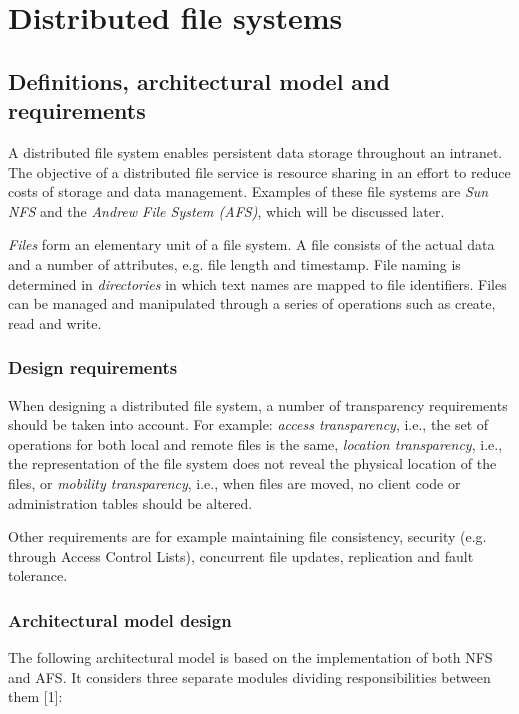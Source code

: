 \chapter{Distributed file systems}


\section{Definitions, architectural model and requirements}

A distributed file system enables persistent data storage throughout an intranet. The objective of a distributed file service is resource sharing in an effort to reduce costs of storage and data management. Examples of these file systems are \emph{Sun NFS} and the \emph{Andrew File System (AFS)}, which will be discussed later.

\emph{Files} form an elementary unit of a file system. A file consists of the actual data and a number of attributes, e.g. file length and timestamp. File naming is determined in \emph{directories} in which text names are mapped to file identifiers. Files can be managed and manipulated through a series of operations such as create, read and write.


\subsection{Design requirements}

When designing a distributed file system, a number of transparency requirements should be taken into account. For example: \emph{access transparency}, i.e., the set of operations for both local and remote files is the same, \emph{location transparency}, i.e., the representation of the file system does not reveal the physical location of the files, or \emph{mobility transparency}, i.e., when files are moved, no client code or administration tables should be altered.

Other requirements are for example maintaining file consistency, security (e.g. through Access Control Lists), concurrent file updates, replication and fault tolerance.


\subsection{Architectural model design}

The following architectural model is based on the implementation of both NFS and AFS. It considers three separate modules dividing responsibilities between them [1]:

